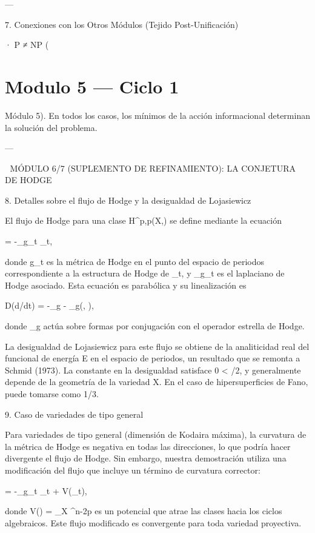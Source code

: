 \documentclass[12pt,twoside]{book}
\begin{document}
---

7. Conexiones con los Otros Módulos (Tejido Post-Unificación)

· P ≠ NP (

\chapter{Modulo 5 — Ciclo 1}
Módulo 5). En todos los casos, los mínimos de la acción informacional determinan la solución del problema.

---

🧬 MÓDULO 6/7 (SUPLEMENTO DE REFINAMIENTO): LA CONJETURA DE HODGE

8. Detalles sobre el flujo de Hodge y la desigualdad de Lojasiewicz

El flujo de Hodge para una clase \alpha \in H^{p,p}(X,) se define mediante la ecuación

 = -\Delta_{g_t} \alpha_t,

donde g_t es la métrica de Hodge en el punto del espacio de periodos correspondiente a la estructura de Hodge de \alpha_t, y \Delta_{g_t} es el laplaciano de Hodge asociado. Esta ecuación es parabólica y su linealización es

D(d\alpha/dt) \cdot \beta = -\Delta_g \beta - _g(\beta, \cdot),

donde _g actúa sobre formas por conjugación con el operador estrella de Hodge.

La desigualdad de Lojasiewicz para este flujo se obtiene de la analiticidad real del funcional de energía E en el espacio de periodos, un resultado que se remonta a Schmid (1973). La constante \theta en la desigualdad satisface 0 < \theta {}/2, y generalmente depende de la geometría de la variedad X. En el caso de hipersuperficies de Fano, \theta puede tomarse como 1/3.

9. Caso de variedades de tipo general

Para variedades de tipo general (dimensión de Kodaira máxima), la curvatura de la métrica de Hodge es negativa en todas las direcciones, lo que podría hacer divergente el flujo de Hodge. Sin embargo, nuestra demostración utiliza una modificación del flujo que incluye un término de curvatura corrector:

 = -\Delta_{g_t} \alpha_t + \nabla V(\alpha_t),

donde V(\alpha) = \int_X \alpha \wedge \alpha \wedge \omega^{n-2p} es un potencial que atrae las clases hacia los ciclos algebraicos. Este flujo modificado es convergente para toda variedad proyectiva.
\end{document}

